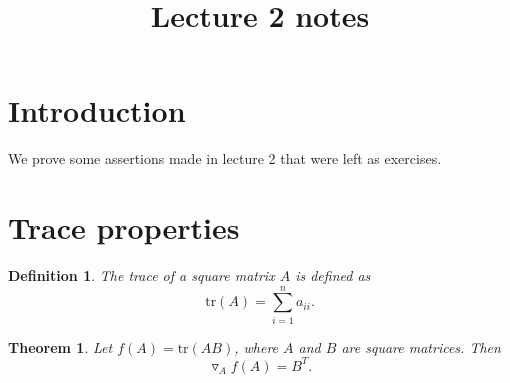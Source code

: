 \documentclass{article}
\begin{document}
\title{Lecture 2 notes}
\date{}
\maketitle
\setlength{\parskip}{0.5em}
\setlength{\parindent}{0pt}
\section{Introduction}
We prove some assertions made in lecture 2 that were left as exercises. 

\section{Trace properties}
\newtheorem*{theorem}{Theorem}
\newtheorem*{lemma}{Lemma}
\newtheorem*{corollary}{Corollary}
\newtheorem*{proposition}{Proposition}
\newtheorem*{definition}{Definition}
\newtheorem*{remark}{Remark}

\begin{definition}
The trace of a square matrix $A$ is defined as
\begin{equation}
\mathrm{tr}(A) = \sum_{i=1}^n a_{ii}.
\end{equation}
\end{definition}

\begin{theorem}
Let $f(A) = \mathrm{tr}(AB)$, where $A$ and $B$ are square matrices. Then
\begin{equation}
\triangledown_A f(A) = B^T.
\end{equation}
\end{theorem}
\end{document}
